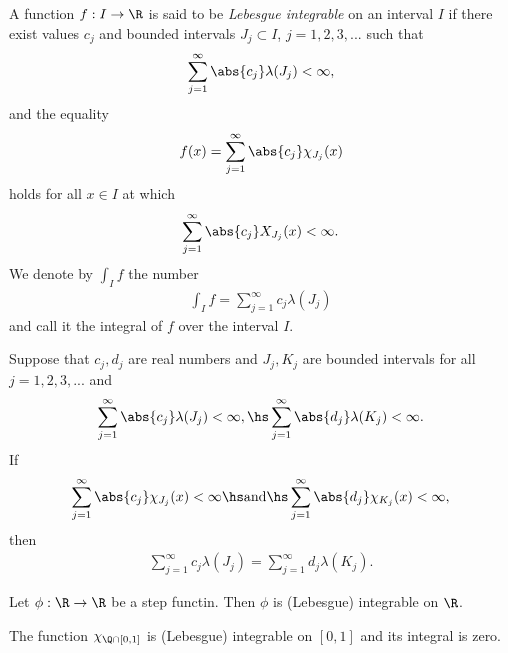 \documentclass{article}
\begin{document}
\begin{definition}[Notes 4.3]
    A function $f:I\to\R$ is said to be \emph{Lebesgue integrable} on an interval
    $I$ if there exist values $c_j$ and bounded intervals $J_j\subset I$, $j=1,2,3,...$
    such that
    \begin{align*}
        \sum_{j=1}^\infty \abs{c_j}\lambda (J_j) < \infty,
    \end{align*}
    and the equality
    \begin{align*}
        f(x) = \sum_{j=1}^\infty \abs{c_j}\chi_{J_j}(x)
    \end{align*}
    holds for all $x\in I$ at which
    \begin{align*}
        \sum_{j=1}^\infty \abs{c_j} X_{J_j}(x) < \infty.
    \end{align*}
    We denote by $\int_I f$ the number
    \begin{align*}
        \int_I f = \sum_{j=1}^\infty c_j\lambda(J_j)
    \end{align*}
    and call it the integral of $f$ over the interval $I$.
\end{definition}

\begin{theorem}[Notes 4.1]
    Suppose that $c_j,d_j$ are real numbers and $J_j,K_j$ are bounded intervals
    for all $j=1,2,3,...$ and
    \begin{align*}
        \sum_{j=1}^\infty \abs{c_j}\lambda(J_j)<\infty, \hs
        \sum_{j=1}^\infty \abs{d_j}\lambda(K_j)<\infty.
    \end{align*}
    If
    \begin{align*}
        \sum_{j=1}^\infty \abs{c_j}\chi_{J_j}(x) < \infty\hs\text{and}\hs
        \sum_{j=1}^\infty \abs{d_j}\chi_{K_j}(x) <\infty,
    \end{align*}
    then
    \begin{align*}
        \sum_{j=1}^\infty c_j\lambda(J_j)= \sum_{j=1}^\infty d_j\lambda(K_j).
    \end{align*}
\end{theorem}

\begin{corollary}
    Let $\phi:\R\to\R$ be a step functin. Then $\phi$ is (Lebesgue) integrable on $\R$.
\end{corollary}

\begin{corollary}
    The function $\chi_{\Q\cap[0,1]}$ is (Lebesgue) integrable on $[0,1]$ and its integral is zero.
\end{corollary}
\end{document}
